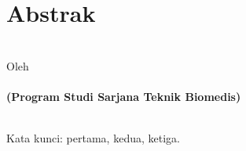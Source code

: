 \clearpage
\chapter*{Abstrak}

\begin{center}
	\linespread{1}
	\large{\bfseries{
			\MakeUppercase\thetitle
		}
	}\\[1\baselineskip]
	\normalsize{Oleh\\}
	\large{ 
		\bfseries \theauthor\\
		(Program Studi Sarjana Teknik Biomedis)
	}\\[2\baselineskip]
\end{center}
\begin{spacing}{1.0}
	\blindtext
	
	\blindtext
	\\[1.67\baselineskip]
	Kata kunci: pertama, kedua, ketiga.
\end{spacing}

\clearpage
